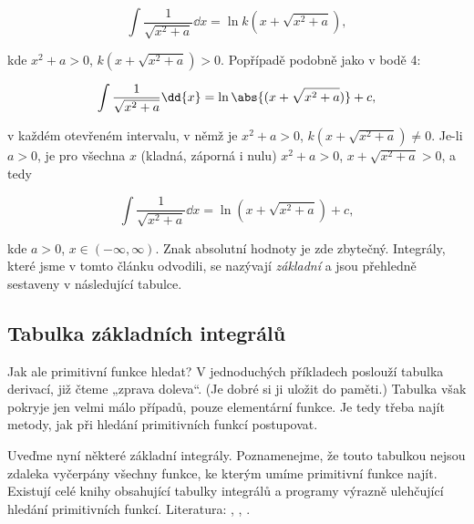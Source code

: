\begin{enumerate}
\begin{fleqn}[\parindent]
              \begin{equation*}
                \int\dfrac{1}{\sqrt{x^2+a}}\dd{x} = \ln k(x+\sqrt{x^2+a}),
              \end{equation*}
            \end{fleqn}
            kde \(x^2+a>0\), \(k(x+\sqrt{x^2+a})>0\). Popřípadě podobně jako v bodě 4:
            \begin{fleqn}[\parindent]
              \begin{equation*}
                \int\dfrac{1}{\sqrt{x^2+a}}\dd{x} = \ln\abs{(x+\sqrt{x^2+a})} + c,
              \end{equation*}
            \end{fleqn}
            v každém otevřeném intervalu, v němž je \(x^2+a>0\), \(k(x+\sqrt{x^2+a})\neq0\). Je-li
            \(a>0\), je pro všechna \(x\) (kladná, záporná i nulu) \(x^2+a>0\),
            \(x+\sqrt{x^2+a}>0\), a tedy
            \begin{fleqn}[\parindent]
              \begin{equation*}
                \int\dfrac{1}{\sqrt{x^2+a}}\dd{x} = \ln (x+\sqrt{x^2+a}) + c,
              \end{equation*}
            \end{fleqn}
            kde \(a>0\), \(x\in(-\infty, \infty)\). Znak absolutní hodnoty je zde zbytečný.
            Integrály, které jsme v tomto článku odvodili, se nazývají \emph{základní} a jsou
            přehledně sestaveny v následující tabulce.
    \end{enumerate}
  
    \subsection{Tabulka základních integrálů}\label{MA:chap_tabINT}
      Jak ale primitivní funkce hledat? V jednoduchých příkladech poslouží tabulka derivací, již
      čteme „zprava doleva“. (Je dobré si ji uložit do paměti.) Tabulka však pokryje jen velmi málo
      případů, pouze elementární funkce. Je tedy třeba najít metody, jak při hledání primitivních
      funkcí postupovat.

      Uveďme nyní některé základní integrály. Poznamenejme, že touto tabulkou nejsou zdaleka
      vyčerpány všechny funkce, ke kterým umíme primitivní funkce najít. Existují celé knihy
      obsahující tabulky integrálů a programy výrazně ulehčující hledání primitivních funkcí.
      Literatura: \cite{Rektorys1963}, \cite{Brabec1989}, \cite{diblik2002}. 

